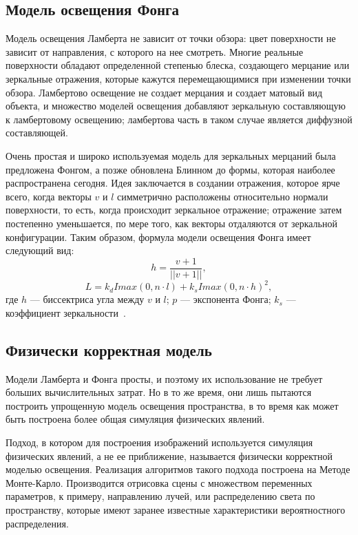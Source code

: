 \subsection{Модель освещения Фонга}
Модель освещения Ламберта не зависит от точки обзора: цвет поверхности не 
зависит от направления, с которого на нее смотреть. Многие реальные поверхности 
обладают определенной степенью блеска, создающего мерцание или зеркальные отражения, 
которые кажутся перемещающимися при изменении точки обзора. 
Ламбертово освещение не создает мерцания и создает матовый вид объекта, 
и множество моделей освещения добавляют зеркальную 
составляющую к ламбертовому освещению; ламбертова часть в таком случае 
является диффузной составляющей. 

Очень простая и широко используемая модель для зеркальных мерцаний была 
предложена Фонгом, а позже обновлена Блинном до 
формы, которая наиболее распространена сегодня. Идея заключается в создании 
отражения, которое ярче всего, когда векторы $v$ и $l$ симметрично расположены 
относительно нормали поверхности, то есть, когда происходит зеркальное 
отражение; отражение затем постепенно уменьшается, по мере того, 
как векторы отдаляются от зеркальной конфигурации. Таким образом, формула модели
освещения Фонга имеет следующий вид:
\begin{equation}
    h = \frac{v + 1}{||v+1||},
\end{equation}
\begin{equation}
    L = k_d I max(0, n \cdot l) + k_s I max(0, n \cdot  h)^2,
\end{equation}
где $h$ --- биссектриса угла между $v$ и $l$; $p$ --- экспонента Фонга; $k_s$ --- коэффициент зеркальности~\cite{IFCGP}\cite{FoCG}.

\subsection{Физически корректная модель}

Модели Ламберта и Фонга просты, и поэтому их использование не требует больших вычислительных
затрат. Но в то же время, они лишь пытаются построить упрощенную модель освещения пространства, в то время как может быть построена более общая симуляция физических явлений.

Подход, в котором для построения изображений используется симуляция физических 
явлений, а не ее приближение, называется физически корректной моделью освещения.
Реализация алгоритмов такого подхода построена на Методе Монте-Карло. Производится
отрисовка сцены с множеством переменных параметров, к примеру, направлению лучей,
или распределению света по пространству, которые имеют заранее известные 
характеристики вероятностного распределения.

